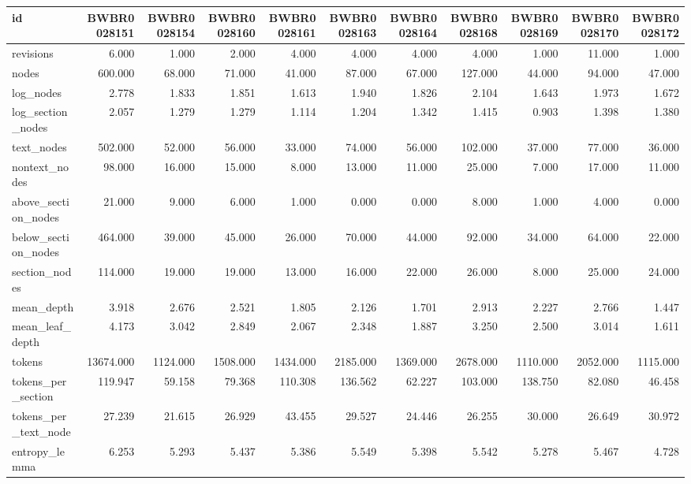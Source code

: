 \begin{tabular}{lrrrrrrrrrr}
\toprule
id & BWBR0028151 & BWBR0028154 & BWBR0028160 & BWBR0028161 & BWBR0028163 & BWBR0028164 & BWBR0028168 & BWBR0028169 & BWBR0028170 & BWBR0028172 \\
\midrule
revisions & 6.000 & 1.000 & 2.000 & 4.000 & 4.000 & 4.000 & 4.000 & 1.000 & 11.000 & 1.000 \\
\cline{1-11}
nodes & 600.000 & 68.000 & 71.000 & 41.000 & 87.000 & 67.000 & 127.000 & 44.000 & 94.000 & 47.000 \\
\cline{1-11}
log\_nodes & 2.778 & 1.833 & 1.851 & 1.613 & 1.940 & 1.826 & 2.104 & 1.643 & 1.973 & 1.672 \\
\cline{1-11}
log\_section\_nodes & 2.057 & 1.279 & 1.279 & 1.114 & 1.204 & 1.342 & 1.415 & 0.903 & 1.398 & 1.380 \\
\cline{1-11}
text\_nodes & 502.000 & 52.000 & 56.000 & 33.000 & 74.000 & 56.000 & 102.000 & 37.000 & 77.000 & 36.000 \\
\cline{1-11}
nontext\_nodes & 98.000 & 16.000 & 15.000 & 8.000 & 13.000 & 11.000 & 25.000 & 7.000 & 17.000 & 11.000 \\
\cline{1-11}
above\_section\_nodes & 21.000 & 9.000 & 6.000 & 1.000 & 0.000 & 0.000 & 8.000 & 1.000 & 4.000 & 0.000 \\
\cline{1-11}
below\_section\_nodes & 464.000 & 39.000 & 45.000 & 26.000 & 70.000 & 44.000 & 92.000 & 34.000 & 64.000 & 22.000 \\
\cline{1-11}
section\_nodes & 114.000 & 19.000 & 19.000 & 13.000 & 16.000 & 22.000 & 26.000 & 8.000 & 25.000 & 24.000 \\
\cline{1-11}
mean\_depth & 3.918 & 2.676 & 2.521 & 1.805 & 2.126 & 1.701 & 2.913 & 2.227 & 2.766 & 1.447 \\
\cline{1-11}
mean\_leaf\_depth & 4.173 & 3.042 & 2.849 & 2.067 & 2.348 & 1.887 & 3.250 & 2.500 & 3.014 & 1.611 \\
\cline{1-11}
tokens & 13674.000 & 1124.000 & 1508.000 & 1434.000 & 2185.000 & 1369.000 & 2678.000 & 1110.000 & 2052.000 & 1115.000 \\
\cline{1-11}
tokens\_per\_section & 119.947 & 59.158 & 79.368 & 110.308 & 136.562 & 62.227 & 103.000 & 138.750 & 82.080 & 46.458 \\
\cline{1-11}
tokens\_per\_text\_node & 27.239 & 21.615 & 26.929 & 43.455 & 29.527 & 24.446 & 26.255 & 30.000 & 26.649 & 30.972 \\
\cline{1-11}
entropy\_lemma & 6.253 & 5.293 & 5.437 & 5.386 & 5.549 & 5.398 & 5.542 & 5.278 & 5.467 & 4.728 \\

\end{tabular}
